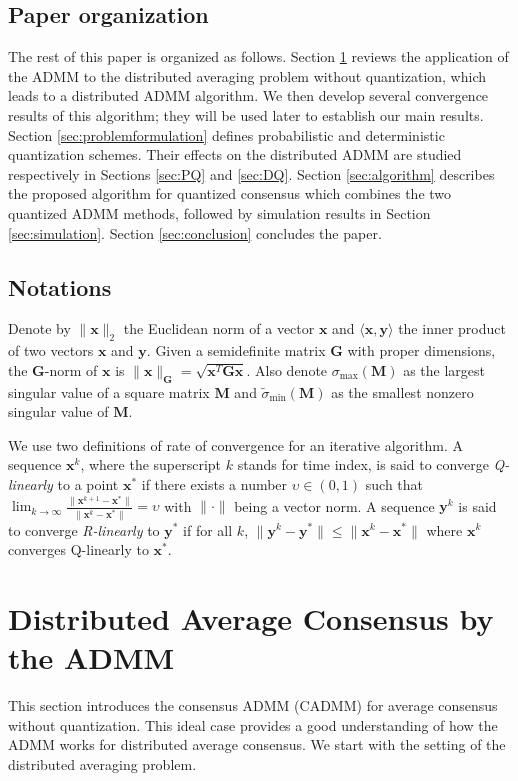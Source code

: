 \documentclass[journal]{IEEEtran}
\begin{document}
\subsection{Paper organization}
The rest of this paper is organized as follows. Section \ref{sec:ADMMnoQ} reviews the application of the ADMM to the distributed averaging problem without quantization, which leads to a distributed ADMM algorithm. We then develop several convergence results of this algorithm; they will be used later to establish our main results. Section \ref{sec:problemformulation} defines probabilistic and deterministic quantization schemes. Their effects on the distributed ADMM are studied respectively in Sections \ref{sec:PQ} and \ref{sec:DQ}. Section \ref{sec:algorithm} describes the proposed algorithm for quantized consensus which combines the two quantized ADMM methods, followed by simulation results in Section \ref{sec:simulation}. Section \ref{sec:conclusion} concludes the paper. 
\subsection{Notations}
Denote by $\|\bm{x}\|_2$ the Euclidean norm of a vector $\bm x$ and $\langle \bm{x},\bm{y} \rangle$ the inner product of two vectors $\bm x$ and $\bm y$. Given a semidefinite matrix $\bm G$ with proper dimensions, the $\bm G$-norm of $\bm x$ is $\|\bm x\|_{\bm G}=\sqrt{\bm{x}^T\bm{Gx}}$. Also denote $\sigma_{\max}(\bm{M})$ as the largest singular value of a square matrix $\bm M$ and $\tilde{\sigma}_{\min}(\bm{M})$ as the smallest nonzero singular value of $\bm{M}$. 

We use two definitions of rate of convergence for an iterative algorithm. A sequence $\bm x^k$, where the superscript $k$ stands for time index, is said to converge \emph{Q-linearly} to a point $\bm x^*$ if there exists a number $\upsilon\in(0,1)$ such that $\lim_{k\to\infty}\frac{\|\bm x^{k+1}-\bm x^*\|}{\|\bm x^k-\bm x^*\|}=\upsilon$ with $\|\cdot\|$ being a vector norm. A sequence $\bm y^k$ is said to converge \emph{R-linearly} to $\bm y^*$ if for all $k$, $\|\bm y^k-\bm y^*\|\leq\|\bm x^k-\bm x^*\|$ where $\bm x^k$ converges Q-linearly to $\bm x^*$.

\section{Distributed Average Consensus by the ADMM}
\label{sec:ADMMnoQ}
This section introduces the consensus ADMM (CADMM) for average consensus without quantization. This ideal case provides a good understanding of how the ADMM works for distributed average consensus. We start with the setting of the distributed averaging problem.
\end{document}
